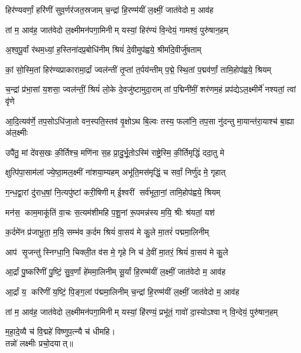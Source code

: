 

\twolineshloka
{हिर॑ण्यवर्णां॒ हरि॑णीं सुव॒र्णर॑जत॒स्रजाम्}%
{च॒न्द्रां हि॒रण्म॑यीं ल॒क्ष्मीं॒ जात॑वेदो म॒ आव॑ह}%

\twolineshloka
{तां म॒ आव॑ह॒ जात॑वेदो ल॒क्ष्मीमन॑पगा॒मिनीम्}%
{यस्यां॒ हिर॑ण्यं वि॒न्देयं॒ गामश्वं॒ पुरु॑षान॒हम्}%

\twolineshloka
{अ॒श्व॒पू॒र्वां र॑थम॒ध्यां॒ ह॒स्तिना॑दप्र॒बोधि॑नीम्}%
{श्रियं॑ दे॒वीमुप॑ह्वये॒ श्रीर्मा॑दे॒वीर्जु॑षताम्}%

\twolineshloka
{कां॒ सो॒\aav{}स्मि॒तां हिर॑ण्यप्राकारामा॒र्द्रां ज्वल॑न्तीं तृ॒प्तां त॒र्पय॑न्तीम्}%
{प॒द्मे॒ स्थि॒तां प॒द्मव॑र्णां॒ तामि॒होप॑ह्वये॒ श्रियम्}%

\twolineshloka
{च॒न्द्रां प्र॑भा॒सां य॒शसा॒ ज्वल॑न्तीं॒ श्रियं॑ लो॒के दे॒वजु॑ष्टामुदा॒राम्}%
{तां प॒द्मिनी॑मीं॒ शर॑णम॒हं प्रप॑द्येऽल॒क्ष्मीर्मे॑ नश्यतां॒ त्वां वृ॑णे}%

\twolineshloka
{आ॒दि॒त्यव॑र्णे॒ तप॒सोऽधि॑जा॒तो वन॒स्पति॒स्तव॑ वृ॒क्षोऽथ बि॒ल्वः}%
{तस्य॒ फला॑नि॒ तप॒सा नु॑दन्तु मा॒यान्त॑रा॒याश्च॑ बा॒ह्या अ॑ल॒क्ष्मीः}%

\twolineshloka
{उपै॑तु॒ मां दे॑वस॒खः की॒र्तिश्च॒ मणि॑ना स॒ह}%
{प्रा॒दु॒र्भू॒तोऽस्मि॑ राष्ट्रे॒\aav{}स्मि॒\an{} की॒र्तिमृद्धिं॑ ददा॒तु मे}%

\twolineshloka
{क्षुत्पि॑पा॒साम॑लां ज्ये॒ष्ठा॒मल॒क्ष्मीं ना॑शया॒म्यहम्}%
{अभू॑ति॒मस॑मृद्धिं॒ च सर्वां॒ निर्णु॑द मे॒ गृहात्}%

\twolineshloka
{ग॒न्ध॒द्वा॒रां दु॑राध॒\ar{}षां॒ नि॒त्यपु॑ष्टां करी॒षिणीम्}%
{ई॒श्वरीं सर्व॑भूता॒नां॒ तामि॒होप॑ह्वये॒ श्रियम्}%

\twolineshloka
{मन॑स॒ काम॒माकू॑तिं वा॒चः स॒त्यम॑शीमहि}%
{प॒शू॒नां रू॒पमन्न॑स्य म॒यि॒ श्रीः श्र॑यतां॒ यश॑}%

\twolineshloka
{क॒र्दमे॑न प्र॑जाभू॒ता॒ म॒यि॒ सम्भ॑व क॒र्दम}%
{श्रियं॑ वा॒सय॑ मे कु॒ले मा॒तरं॑ पद्ममा॒लिनीम्}%

\twolineshloka
{आप॑ सृ॒जन्तु॑ स्निग्धा॒नि॒ चिक्ली॒त व॑स मे॒ गृहे}%
{नि च॑ दे॒वीं मा॒तरं॒ श्रियं॑ वा॒सय॑ मे कु॒ले}%

\twolineshloka
{आ॒र्द्रां पु॒ष्करि॑णीं पु॒ष्टिं॒ सु॒व॒र्णां हे॑ममा॒लिनीम्}%
{सू॒र्यां हि॒रण्म॑यीं ल॒क्ष्मीं॒ जात॑वेदो म॒ आव॑ह}%

\twolineshloka
{आ॒र्द्रां य॒ करि॑णीं य॒ष्टिं॒ पि॒ङ्ग॒लां प॑द्ममा॒लिनीम्}%
{च॒न्द्रां हि॒रण्म॑यीं ल॒क्ष्मीं॒ जात॑वेदो म॒ आव॑ह}%

\twolineshloka
{तां म॒ आव॑ह॒ जात॑वेदो ल॒क्ष्मीमन॑पगा॒मिनीम्}%
{यस्यां॒ हि॑रण्यं॒ प्रभू॑तं॒ गावो॑ दा॒स्योऽश्वान् वि॒न्देयं॒ पुरु॑षान॒हम्}%

{म॒हा॒दे॒व्यै च॑ वि॒द्महे॑ विष्णुप॒त्न्यै च॑ धीमहि।\\
तन्नो॑ लक्ष्मीः प्रचो॒दयात्॥}